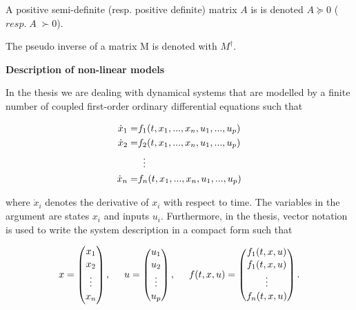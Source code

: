 A positive semi-definite (resp. positive definite) matrix $A$ is is denoted $A \succeq 0$ ($resp.\; A \; \succ 0$).

The pseudo inverse of a matrix M is denoted with $M^{\dagger}$.

\textbf{Description of non-linear models}

In the thesis we are dealing with dynamical systems that are modelled by a finite number of coupled first-order ordinary differential equations such that 

\vspace{-4mm}
\begin{equation*}
\begin{split}
  \label{non-inlet_p1}
  \dot{x}_1 = & f_1(t,x_1, ..., x_n,u_1,...,u_p) \\
  \dot{x}_2 = & f_2(t,x_1, ..., x_n,u_1,...,u_p) \\
   &\mathrel{\makebox[\widthof{=}]{\vdots}} \\
   \dot{x}_n = & f_n(t,x_1, ..., x_n,u_1,...,u_p)
\end{split}
\end{equation*}
\vspace{-3mm}

where $\dot{x}_i$ denotes the derivative of $x_i$ with respect to time. The variables in the argument are states $x_i$ and inputs $u_i$. Furthermore, in the thesis, vector notation is used to write the system description in a compact form such that 

\vspace{-4mm}
\begin{equation*}
\label{example1_signals_constants}
x =
 \begin{pmatrix} 
 x_1 \\[1.3pt] 
 x_2 \\[1.3pt]
 \vdots \\[1.3pt] 
 x_n \\[1.3pt] 
 \end{pmatrix}
 , \hspace{5mm}
u =  \begin{pmatrix} 
 u_1 \\[1pt] 
 u_2 \\[1pt]
 \vdots \\[1pt] 
 u_p \\[1pt] 
 \end{pmatrix}
 , \hspace{5mm}
 f(t,x,u) =  \begin{pmatrix} 
 f_1(t,x,u) \\[1pt] 
 f_1(t,x,u) \\[1pt]
 \vdots \\[1pt] 
 f_n(t,x,u) \\[1pt] 
 \end{pmatrix}.
\end{equation*}

